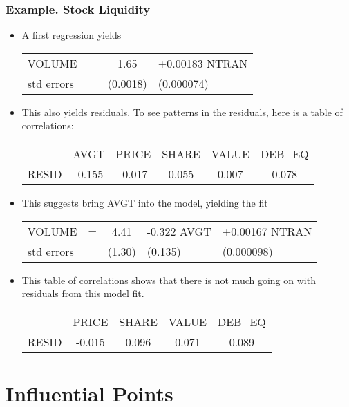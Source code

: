 \begin{frame}%
 \frametitle{Example. Stock Liquidity}
 \begin{itemize}
   \item A first regression yields
\begin{center}
\begin{tabular}{lccl}
  VOLUME & = & 1.65 & +0.00183 NTRAN \\
  std errors &  & (0.0018)  & (0.000074) \\
\end{tabular}
\end{center}
 \item This also yields residuals. To see patterns in the residuals,
 here is a table of correlations:
 \begin{table}[h]
\begin{tabular}{cccccc}
 \hline
& AVGT & PRICE & SHARE & VALUE & DEB\_EQ \\
RESID & -0.155 & -0.017 & 0.055 & 0.007 & 0.078 \\ \hline
\end{tabular}
\end{table}

\item This suggests bring AVGT into the model, yielding the fit
\begin{center}
\begin{tabular}{lccll}
  VOLUME     & = & 4.41   & -0.322 AVGT & +0.00167 NTRAN \\
  std errors &   & (1.30) & (0.135)     & (0.000098)     \\
\end{tabular}
\end{center}
\item  This table of correlations shows that there is not much going on with residuals from this model fit.
\begin{table}[h]
\begin{tabular}{ccccc}
\hline
& PRICE & SHARE & VALUE & DEB\_EQ \\
RESID & -0.015 & 0.096 & 0.071 & 0.089 \\ \hline
\end{tabular}
\end{table}
    \end{itemize}
\end{frame}

\section{Influential Points}

